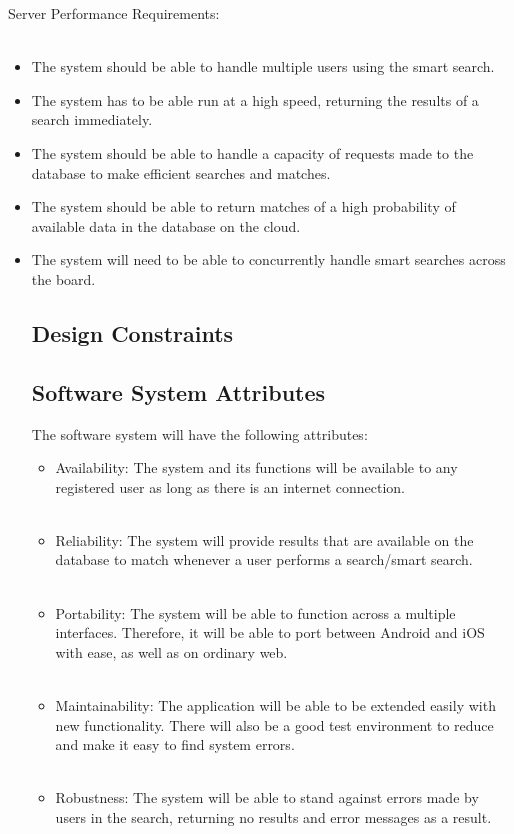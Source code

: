 \documentclass[a4paper,10pt]{article}
\begin{document}
{	\item Server Performance Requirements:\\\\
		\begin{itemize}
		\item The system should be able to handle multiple users using the smart search.\\
		\item The system has to be able run at a high speed, returning the results of a search immediately.\\
		\item The system should be able to handle a capacity of requests made to the database to make efficient searches and matches. \\
		\item The system should be able to return matches of a high probability of available data in the database on the cloud.\\
		\item The system will need to be able to concurrently handle smart searches across the board.
		
	\subsection{Design Constraints}

	\subsection{Software System Attributes}
	The software system will have the following attributes:
		
		\begin{itemize}
		\item Availability: The system and its functions will be available to any registered user as long as there is an internet connection. 
\\\\
		\item Reliability: The system will provide results that are available on the database to match whenever a user performs a search/smart search.
\\\\
		\item Portability: The system will be able to function across a multiple interfaces. Therefore, it will be able to port between Android and iOS with ease, as well as on ordinary web. 
\\\\
		\item Maintainability: The application will be able to be extended easily with new functionality. There will also be a good test environment to reduce and make it easy to find system errors.  
\\\\
		\item Robustness: The system will be able to stand against errors made by users in the search, returning no results and error messages as a result.
		\end{itemize}
        

\end{itemize}}
\end{document}
